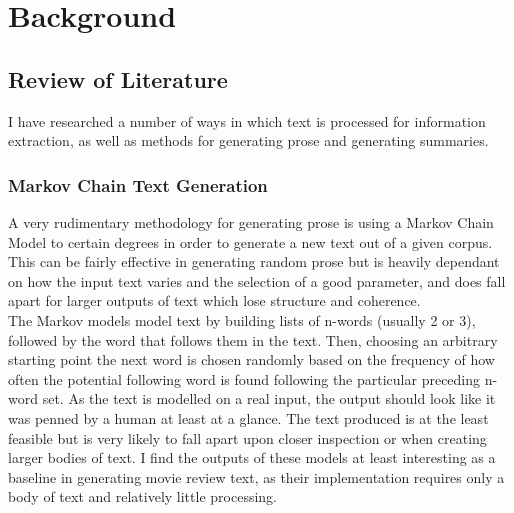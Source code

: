 \chapter{\label{ch:2-litreview}Background}


\section{Review of Literature}
I have researched a number of ways in which text is processed for information extraction, as well as methods for generating prose and generating summaries.
\subsection{Markov Chain Text Generation}
A very rudimentary methodology for generating prose is using a Markov Chain Model to certain degrees in order to generate a new text out of a given corpus\cite{MarkovTextGenerator}. This can be fairly effective in generating random prose but is heavily dependant on how the input text varies and the selection of a good parameter, and does fall apart for larger outputs of text which lose structure and coherence.\\ %

The Markov models model text by building lists of n-words (usually 2 or 3), followed by the word that follows them in the text. Then, choosing an arbitrary starting point the next word is chosen randomly based on the frequency of how often the potential following word is found following the particular preceding n-word set. As the text is modelled on a real input, the output should look like it was penned by a human at least at a glance. The text produced is at the least feasible but is very likely to fall apart upon closer inspection or when creating larger bodies of text. I find the outputs of these models at least interesting as a baseline in generating movie review text, as their implementation requires only a body of text and relatively little processing.

